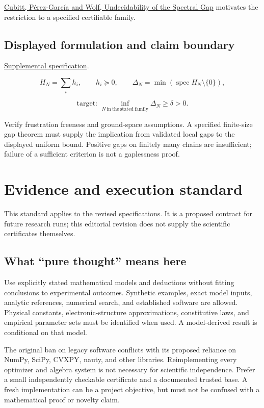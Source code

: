 \documentclass[
  11pt,
]{article}
\begin{document}
\href{https://arxiv.org/abs/1502.04573}{Cubitt, Pérez-García and Wolf,
Undecidability of the Spectral Gap} motivates the restriction to a
specified certifiable family.

\subsection{Displayed formulation and claim boundary}

\href{https://github.com/rick-stevens-ai/Pure-Thought/blob/main/supplemental/S07.md}{Supplemental
specification}.

\[H_N=\sum_i h_i,\qquad h_i\succeq0,\qquad
\Delta_N=\min(\operatorname{spec}H_N\setminus\{0\}),\]

\[\text{target: }\inf_{N\ \mathrm{in\ the\ stated\ family}}\Delta_N\ge\delta>0.\]

Verify frustration freeness and ground-space assumptions. A specified
finite-size gap theorem must supply the implication from validated local
gaps to the displayed uniform bound. Positive gaps on finitely many
chains are insufficient; failure of a sufficient criterion is not a
gaplessness proof.

\section{Evidence and execution standard}

This standard applies to the revised specifications. It is a proposed
contract for future research runs; this editorial revision does not
supply the scientific certificates themselves.

\subsection{What ``pure thought'' means here}

Use explicitly stated mathematical models and deductions without fitting
conclusions to experimental outcomes. Synthetic examples, exact model
inputs, analytic references, numerical search, and established software
are allowed. Physical constants, electronic-structure approximations,
constitutive laws, and empirical parameter sets must be identified when
used. A model-derived result is conditional on that model.

The original ban on legacy software conflicts with its proposed reliance
on NumPy, SciPy, CVXPY, nauty, and other libraries. Reimplementing every
optimizer and algebra system is not necessary for scientific
independence. Prefer a small independently checkable certificate and a
documented trusted base. A fresh implementation can be a project
objective, but must not be confused with a mathematical proof or novelty
claim.
\end{document}
